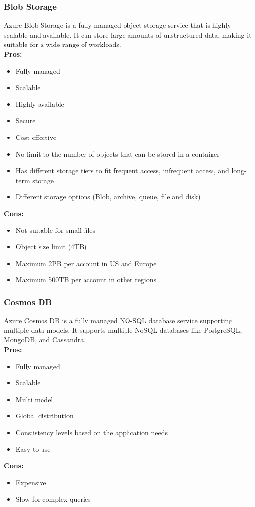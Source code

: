         \subsubsection{Blob Storage}
        \label{azure:blob-storage}
        Azure Blob Storage is a fully managed object storage service that is highly scalable and available. 
        It can store large amounts of unstructured data, making it suitable for a wide range of workloads.\\
        \textbf{Pros:}
        \begin{itemize}
            \item Fully managed
            \item Scalable
            \item Highly available
            \item Secure
            \item Cost effective
            \item No limit to the number of objects that can be stored in a container
            \item Has different storage tiers to fit frequent access, infrequent access, and long-term storage
            \item Different storage options (Blob, archive, queue, file and disk) 
        \end{itemize}
        \textbf{Cons:}
        \begin{itemize}
            \item Not suitable for small files
            \item Object size limit (4TB)
            \item Maximum 2PB per account in US and Europe
            \item Maximum 500TB per account in other regions
        \end{itemize}

        \subsubsection{Cosmos DB}
        \label{azure:cosmos-db}
        Azure Cosmos DB is a fully managed NO-SQL database service supporting multiple data models. It supports multiple NoSQL databases like PostgreSQL, MongoDB, and Cassandra.\\
        \textbf{Pros:}
        \begin{itemize}
            \item Fully managed
            \item Scalable
            \item Multi model
            \item Global distribution
            \item Cons:istency levels based on the application needs
            \item Easy to use
        \end{itemize}
        \textbf{Cons:}
        \begin{itemize}
            \item Expensive
            \item Slow for complex queries
        \end{itemize}

